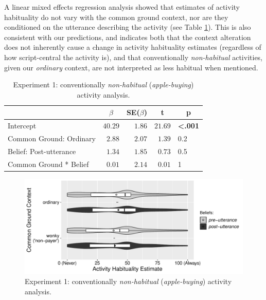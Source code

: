 \documentclass{sp}\usepackage[]{graphicx}\usepackage[]{color}
\makeatletter
\def\maxwidth{ %
  \ifdim\Gin@nat@width>\linewidth
    \linewidth
  \else
    \Gin@nat@width
  \fi
}
\newenvironment{knitrout}{}{} %
\makeatother
\begin{document}
A linear mixed effects regression analysis showed that estimates of activity habituality do not vary with the common ground context, nor are they conditioned on the utterance describing the activity (see Table \ref{tab:exp1nonhabitual}). This is also consistent with our predictions, and indicates both that the context alteration does not inherently cause a change in activity habituality estimates (regardless of how script-central the activity is), and that conventionally \textit{non-habitual} activities, given our \textit{ordinary} context, are not interpreted as less habitual when mentioned.

\begin{table}[ht]
\caption{Experiment 1: conventionally \textit{non-habitual} (\textit{apple-buying}) activity analysis.\label{tab:exp1nonhabitual}} 
\begin{center}
\begin{tabular}{lrrrl}
\toprule
\multicolumn{1}{l}{}&\multicolumn{1}{c}{$\beta$}&\multicolumn{1}{c}{SE($\beta$)}&\multicolumn{1}{c}{\textbf{t}}&\multicolumn{1}{c}{\textbf{p}}\tabularnewline
\midrule
Intercept&$40.29$&$1.86$&$21.69$&\textbf{\textless .001}\tabularnewline
Common Ground: Ordinary&$ 2.88$&$2.07$&$ 1.39$&0.2\tabularnewline
Belief: Post-utterance&$ 1.34$&$1.85$&$ 0.73$&0.5\tabularnewline
Common Ground * Belief&$ 0.01$&$2.14$&$ 0.01$&1\tabularnewline
\bottomrule
\end{tabular}\end{center}
\end{table}


\begin{knitrout}
\color{fgcolor}\begin{figure}
\includegraphics[width=\maxwidth]{figure/unnamed-chunk-20-1} \caption{\label{fig:exp1nonhabitual}Experiment 1: conventionally \textit{non-habitual} (\textit{apple-buying}) activity analysis.}\label{fig:unnamed-chunk-20}
\end{figure}


\end{knitrout}
\end{document}
